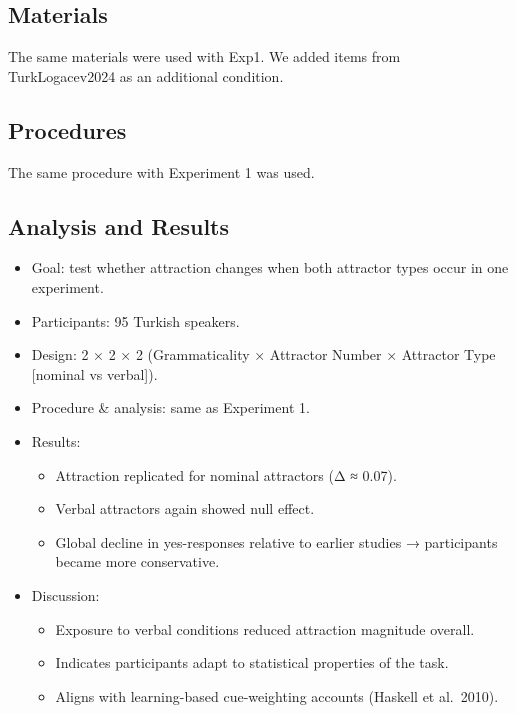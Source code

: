 \documentclass[
  authoryear,
  preprint]{elsarticle}
\providecommand{\tightlist}{%
  \setlength{\itemsep}{0pt}\setlength{\parskip}{0pt}}
\begin{document}
\subsection{Materials}\label{materials-1}

The same materials were used with Exp1. We added items from
TurkLogacev2024 as an additional condition.

\subsection{Procedures}\label{procedures-1}

The same procedure with Experiment 1 was used.

\subsection{Analysis and Results}\label{analysis-and-results-1}

\begin{itemize}
\tightlist
\item
  Goal: test whether attraction changes when both attractor types occur
  in one experiment.
\item
  Participants: 95 Turkish speakers.
\item
  Design: 2 × 2 × 2 (Grammaticality × Attractor Number × Attractor Type
  {[}nominal vs verbal{]}).
\item
  Procedure \& analysis: same as Experiment 1.
\item
  Results:

  \begin{itemize}
  \tightlist
  \item
    Attraction replicated for nominal attractors (Δ ≈ 0.07).
  \item
    Verbal attractors again showed null effect.
  \item
    Global decline in yes-responses relative to earlier studies →
    participants became more conservative.
  \end{itemize}
\item
  Discussion:

  \begin{itemize}
  \tightlist
  \item
    Exposure to verbal conditions reduced attraction magnitude overall.
  \item
    Indicates participants adapt to statistical properties of the task.
  \item
    Aligns with learning-based cue-weighting accounts (Haskell et
    al.~2010).
  \end{itemize}
\end{itemize}
\end{document}
